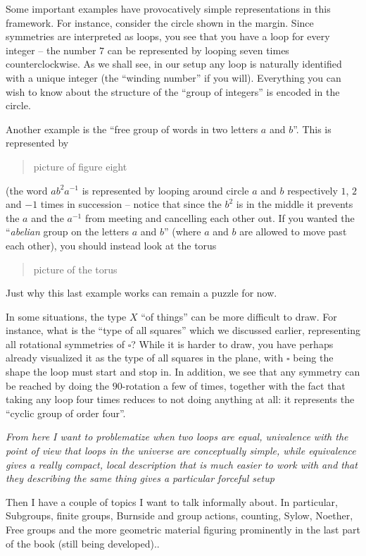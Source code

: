 Some important examples have provocatively simple representations in this framework.  For instance, consider the circle shown in the margin.
Since symmetries are interpreted as loops, you see that you have a loop for every integer -- the number $7$ can be represented by looping seven times counterclockwise.  As we shall see, in our setup any loop is naturally identified with a unique integer (the ``winding number'' if you will).  Everything you can wish to know about the structure of the ``group of integers'' is encoded in the circle.

Another example is the ``free group of words in two letters $a$ and $b$''.  This is represented by
\begin{quote}
  picture of figure eight
\end{quote}
(the word $ab^2a^{-1}$ is represented by looping around circle $a$ and $b$ respectively $1$, $2$ and $-1$ times in succession -- notice that since the $b^2$ is in the middle it prevents the $a$ and the $a^{-1}$ from meeting and cancelling each other out.  If you wanted the ``\emph{abelian} group on the letters $a$ and $b$'' (where $a$ and $b$ are allowed to move past each other), you should instead look at the torus
\begin{quote}
  picture of the torus
\end{quote}
Just why this last example works can remain a puzzle for now.

In some situations, the type $X$ ``of things'' can be more difficult to draw.  For instance, what is the ``type of all squares'' which we discussed earlier, representing all rotational symmetries of $\square$?  While it is harder to draw, you have perhaps already visualized it as the type of all squares in the plane, with $\square$ being the shape the loop must start and stop in.  In addition, we see that any symmetry can be reached by doing the $90$\textdegree-rotation a few of times, together with the fact that taking any loop four times reduces to not doing anything at all: it represents the ``cyclic group of order four''.


{\em From here I want to problematize when two loops are equal, univalence with the point of view that loops in the universe are conceptually simple, while equivalence gives a really compact, local description that is much easier to work with and that they describing the same thing gives a particular forceful setup

  Then I have a couple of topics I want to talk informally about.  In particular, Subgroups, finite groups, Burnside and group actions, counting, Sylow, Noether, Free groups and the more geometric material figuring prominently in the last part of the book (still being developed)..}






